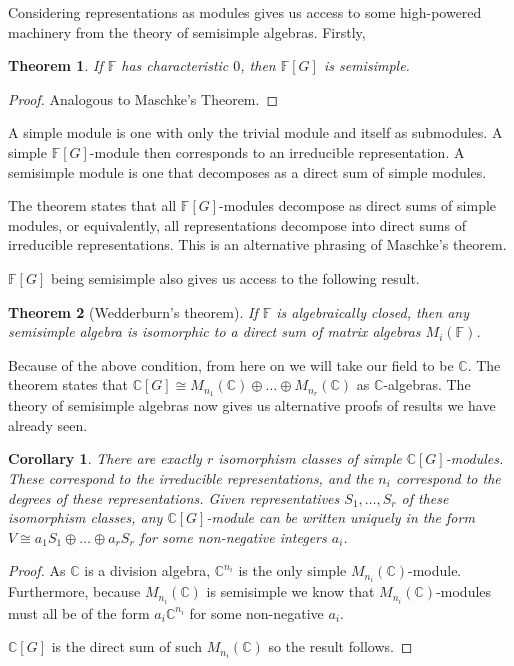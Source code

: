 \documentclass[10pt,a4paper]{article}
\newtheorem{theorem}{Theorem}
\newtheorem{corollary}{Corollary}
\begin{document}
Considering representations as modules gives us access to some high-powered machinery from the theory of semisimple algebras. Firstly,

\begin{theorem}
If $\mathbb{F}$ has characteristic $0$, then $\mathbb{F}[G]$ is semisimple.
\end{theorem}

\begin{proof}
Analogous to Maschke's Theorem.
\end{proof}

A simple module is one with only the trivial module and itself as submodules. A simple $\mathbb{F}[G]$-module then corresponds to an irreducible representation. A semisimple module is one that decomposes as a direct sum of simple modules.

The theorem states that all $\mathbb{F}[G]$-modules decompose as direct sums of simple modules, or equivalently, all representations decompose into direct sums of irreducible representations. This is an alternative phrasing of Maschke's theorem.

$\mathbb{F}[G]$ being semisimple also gives us access to the following result.

\begin{theorem}[Wedderburn's theorem]
If $\mathbb{F}$ is algebraically closed, then any semisimple algebra is isomorphic to a direct sum of matrix algebras $M_i(\mathbb{F})$.
\end{theorem}

Because of the above condition, from here on we will take our field to be $\mathbb{C}$. The theorem states that $\mathbb{C}[G] \cong M_{n_1}(\mathbb{C}) \oplus \dots \oplus M_{n_r}(\mathbb{C})$ as $\mathbb{C}$-algebras. The theory of semisimple algebras now gives us alternative proofs of results we have already seen.

\begin{corollary}
There are exactly $r$ isomorphism classes of simple $\mathbb{C}[G]$-modules. These correspond to the irreducible representations, and the $n_i$ correspond to the degrees of these representations. Given representatives $S_1, \dots, S_r$ of these isomorphism classes, any $\mathbb{C}[G]$-module can be written uniquely in the form $V \cong a_1 S_1 \oplus \dots \oplus a_r S_r$ for some non-negative integers $a_i$.
\end{corollary}

\begin{proof}
As $\mathbb{C}$ is a division algebra, $\mathbb{C}^{n_i}$ is the only simple $M_{n_i}(\mathbb{C})$-module. Furthermore, because $M_{n_i}(\mathbb{C})$ is semisimple we know that $M_{n_i}(\mathbb{C})$-modules must all be of the form $a_i \mathbb{C}^{n_i}$ for some non-negative $a_i$. 

$\mathbb{C}[G]$ is the direct sum of such $M_{n_i}(\mathbb{C})$ so the result follows.
\end{proof}
\end{document}
